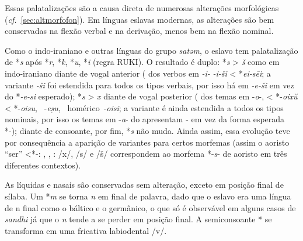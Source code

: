 Essas palatalizações são a causa direta de numerosas alterações morfológicas
(\emph{cf.}~\ref{sec:altmorfofon}).
Em línguas eslavas modernas, as alterações são bem conservadas na
flexão verbal e na derivação, menos bem na flexão nominal.



Como o indo-iraniano e outras línguas do grupo \emph{satəm}, o eslavo tem
palatalização de *\emph{s} após *\emph{r}, *\emph{k}, *\emph{u}, *\emph{i}
(regra RUKI).
O resultado é duplo: *\emph{s} > \emph{š} como em indo-iraniano diante de vogal
anterior ( dos verbos em \emph{-i-}  \emph{-i-ši} <
*\emph{ei-sēi}; a variante \emph{-ši} foi estendida para todos os tipos verbais,
por isso há em  \emph{-e-ši} em vez do *\emph{-e-si} esperado);
*\emph{s} > \emph{x} diante de vogal posterior ( dos temas em
-\emph{o}-,   < \mbox{*-\emph{oixŭ}} < *-\emph{oisu},
~-\emph{eṣu}, ~homérico~-\emph{oisi};
a variante  é ainda estendida a todos os tipos nominais, por isso os temas em
-\emph{a}- do  apresentam - em vez da forma esperada
*-); diante de consoante, por fim, *\emph{s} não muda.
Ainda assim, essa evolução teve por consequência a aparição de variantes para
certos morfemas (assim o aoristo  ``ser'' <*-: 
,  , 
: /x/, /s/ e /š/ correspondem ao morfema *-\emph{s}- de
aoristo em três diferentes contextos).

As líquidas e nasais são conservadas sem alteração, exceto em posição final de
sílaba.
Um *\emph{m} se torna \emph{n} em final de palavra, dado que o eslavo era uma
língua de n final como o báltico e o germânico, o que só é observável em alguns
casos de \emph{sandhi} já que o \emph{n} tende a se perder em posição final.
A semiconsoante * se transforma em uma fricativa labiodental /v/.

